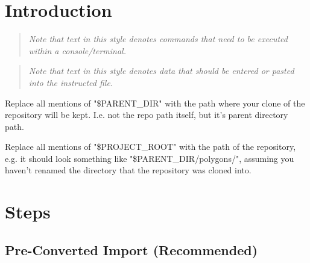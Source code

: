 \documentclass[12pt]{article}
\newenvironment{command}
   { 
      \begin{quote}\itshape
      \color{blue}
   }
   { \end{quote} }
\newenvironment{data}
   { 
      \begin{quote}\itshape
      \color{red}
   }
   { \end{quote} }
\begin{document}
\section{Introduction}

\begin{command} Note that text in this style denotes commands that need to be
executed within a console/terminal. \end{command}

\begin{data} Note that text in this style denotes data that should be entered or
pasted into the instructed file. \end{data}

Replace all mentions of "\$PARENT\_DIR" with the path where your clone of the
repository will be kept. I.e. not the repo path itself, but it's parent
directory path.

Replace all mentions of "\$PROJECT\_ROOT" with the path of the repository, e.g.
it should look something like "\$PARENT\_DIR/polygons/", assuming you haven't
renamed the directory that the repository was cloned into.

\section{Steps}

\subsection{Pre-Converted Import (Recommended)}
\end{document}

